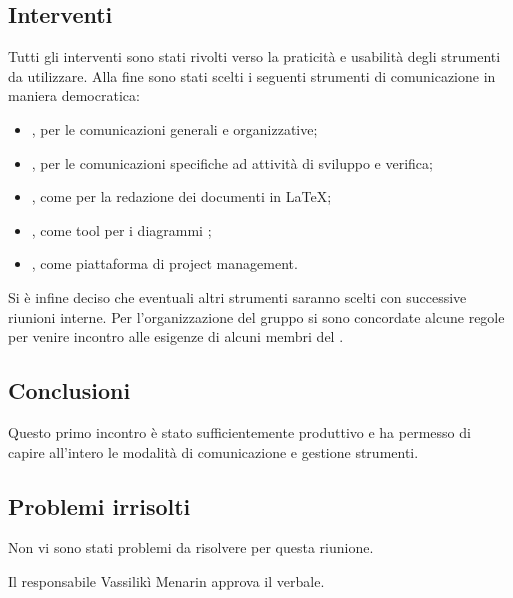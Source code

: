 \documentclass[a4paper]{article}
\def\RESPONSABILE{Vassilikì Menarin}
\begin{document}
\subsection*{Interventi}
Tutti gli interventi sono stati rivolti verso la praticità e usabilità degli strumenti da utilizzare.
Alla fine sono stati scelti i seguenti strumenti di comunicazione in maniera democratica:
\begin{itemize}
	\item {}, per le comunicazioni generali e organizzative;
	\item {}, per le comunicazioni specifiche ad attività di sviluppo e verifica;
	\item {}, come  per la redazione dei documenti in \LaTeX;
	\item {}, come tool per i diagrammi ;
	\item {}, come piattaforma di project management.
\end{itemize}
Si è infine deciso che eventuali altri strumenti saranno scelti con successive riunioni interne.
Per l'organizzazione del gruppo si sono concordate alcune regole per venire incontro alle esigenze di alcuni membri del . 

\subsection*{Conclusioni}
Questo primo incontro è stato sufficientemente produttivo e ha permesso di capire all'intero  le modalità di comunicazione e gestione strumenti.
\subsection*{Problemi irrisolti}
Non vi sono stati problemi da risolvere per questa riunione.

\vspace{2cm}
Il responsabile \RESPONSABILE{} approva il verbale.
\end{document}
